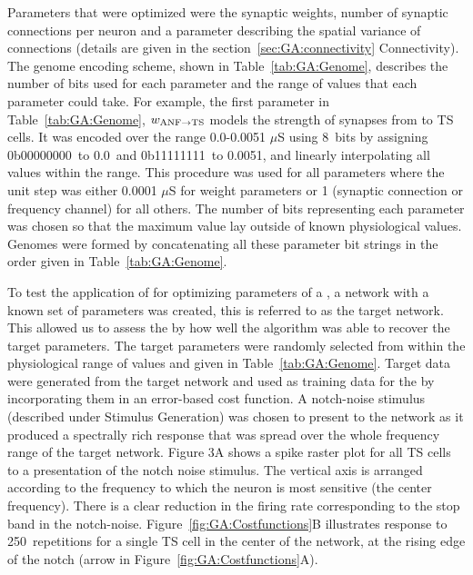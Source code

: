 \smallskip{} 

Parameters that were optimized were the synaptic weights, number of
synaptic connections per neuron and a parameter describing the spatial
variance of connections (details are given in the
section~\ref{sec:GA:connectivity} Connectivity). The genome encoding
scheme, shown in Table~\ref{tab:GA:Genome}, describes the number of bits
used for each parameter and the range of values that each parameter
could take.  For example, the first parameter in Table~\ref{tab:GA:Genome},
$w_{{\rm ANF}\to{\rm TS}}$ models the strength of synapses from {\ANF} to
TS cells. It was encoded over the range 0.0-0.0051 $\mu$S using 8~bits
by assigning 0b00000000~to 0.0~and 0b11111111~to 0.0051, and linearly
interpolating all values within the range. This procedure was used for
all parameters where the unit step was either 0.0001 $\mu$S for weight
parameters or 1 (synaptic connection or frequency channel) for all
others. The number of bits representing each parameter was chosen so
that the maximum value lay outside of known physiological
values. Genomes were formed by concatenating all these parameter bit
strings in the order given in Table~\ref{tab:GA:Genome}.

\smallskip{}

To test the application of {\GAs} for optimizing parameters of a {\BNN}, a
network with a known set of parameters was created, this is referred
to as the target network.  This allowed us to assess the {\GA} by how
well the algorithm was able to recover the target parameters. The
target parameters were randomly selected from within the physiological
range of values and given in Table~\ref{tab:GA:Genome}.  Target data
were generated from the target network and used as training data for
the {\GA} by incorporating them in an error-based cost function.  A
notch-noise stimulus (described under Stimulus Generation) was chosen
to present to the network as it produced a spectrally rich response
that was spread over the whole frequency range of the target network.
Figure 3A shows a spike raster plot for all TS cells to a presentation
of the notch noise stimulus. The vertical axis is arranged according
to the frequency to which the neuron is most sensitive (the center
frequency). There is a clear reduction in the firing rate
corresponding to the stop band in the
notch-noise. Figure~\ref{fig:GA:Costfunctions}B illustrates response
to 250~repetitions for a single TS cell in the center of the network,
at the rising edge of the notch (arrow in
Figure~\ref{fig:GA:Costfunctions}A).

